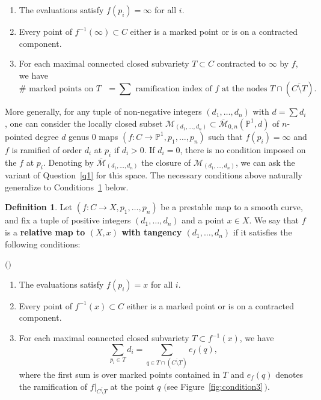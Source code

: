 \documentclass[11pt]{amsart}
\numberwithin{equation}{section}
\newenvironment{cond}[1]{%
  \renewcommand\theconditions{\rm{#1}}%
  \conditions
}{\endconditions}
\theoremstyle{definition}
\newtheorem{definition}[theorem]{Definition}
\theoremstyle{remark}
\newcommand{\bP}{{\mathbb P}}
\newcommand{\mapsd}{\mathcal{M}_{(d_1, \ldots, d_n)}}
\newcommand{\mapsdc}{\overline{\mathcal{M}}_{(d_1, \ldots, d_n)}}
\begin{document}
\begin{enumerate} 
\item The evaluations
  satisfy $f(p_i) = \infty$ for all $i$. 
    \item Every point of $f^{-1}(\infty) \subset C$ either is a marked point or is on a contracted component. 
    \item For each maximal connected closed subvariety $T \subset C$ contracted to $\infty$ by $f$, we have
    \[ \# \textrm{ marked points on $T$ } = \sum \textrm{ ramification index of $f$ at the nodes $T \cap (\overline{C\setminus T})$.}\]
\end{enumerate} 

More generally, for any tuple of non-negative integers $(d_1, \ldots, d_n)$ with $d = \sum d_i$, one can consider the locally closed subset $\mapsd \subset \overline{\mathcal{M}}_{0,n}(\bP^1, d)$ of $n$-pointed degree $d$ genus $0$ maps $(f \colon C \to \bP^1, p_1, \ldots, p_n)$ such that $f(p_i) = \infty$ and $f$ is ramified of order $d_i$ at $p_i$ if $d_i > 0$. If $d_i = 0$, there is no condition imposed on the $f$ at $p_i$. Denoting by $\mapsdc$ the closure of $\mapsd$, we can ask the variant of Question~\ref{q1} for this space. The necessary conditions above naturally generalize to Conditions~\ref{conditions} below. 

\begin{definition} Let $(f \colon C \to X, p_1, \ldots, p_n)$ be a prestable map to a smooth curve, and fix a tuple of positive integers $(d_1, \ldots, d_n)$ and a point $x \in X$. We say that $f$ is a \textbf{relative map to $(X,x)$ with tangency $(d_1,\ldots, d_n)$} if it satisfies the following conditions:

\begin{cond}{($\ast$)} $($\cite[Definition 1.1 \& Remark 1.7]{Gathmann}$)$\label{conditions} \leavevmode
\begin{enumerate}
    \item\label{cond1} The evaluations satisfy $f(p_i) = x$ for all $i$.
    \item\label{cond2} Every point of $f^{-1}(x) \subset C$ either is a marked point or is on a contracted component. 
    \item\label{cond3} For each maximal connected closed subvariety $T \subset f^{-1}(x)$, we have
    \[ \sum_{p_i \in T} d_i = \sum_{q \in T \cap (\overline{C \setminus T})} e_f(q),\]
    where the first sum is over marked points contained in $T$ and $e_f(q)$ denotes the ramification of $f|_{\overline{C \setminus T}}$ at the point $q$ $($see Figure~\ref{fig:condition3}\,$)$. 
\end{enumerate}
\end{cond} 
\end{definition}
\end{document}
